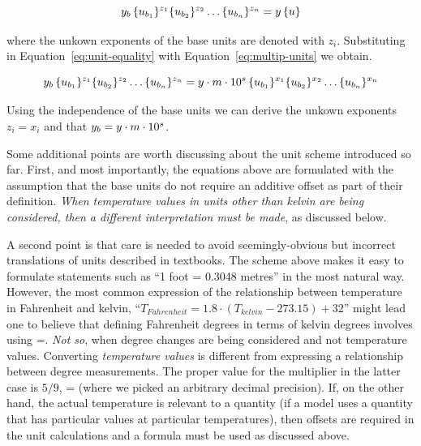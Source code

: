 \begin{linenomath}
\begin{equation}
  y_b \, \{u_{b_1}\}^{z_1} \{u_{b_2}\}^{z_2} \ldots \{u_{b_n}\}^{z_n}
     = y \, \{u\} 
\label{eq:unit-equality}
\end{equation}
\end{linenomath}
where the unkown exponents of the base units are denoted with
$z_i$. Substituting \unew in Equation~\ref{eq:unit-equality} with
Equation~\ref{eq:multip-units} we obtain.
\begin{linenomath}
\begin{equation}
  y_b \, \{u_{b_1}\}^{z_1} \{u_{b_2}\}^{z_2} \ldots \{u_{b_n}\}^{z_n}
    = y \cdot m \cdot 10^s \, \{u_{b_1}\}^{x_1} \{u_{b_2}\}^{x_2} \ldots \{u_{b_n}\}^{x_n}
\label{eq:unit-conversion}
\end{equation}
\end{linenomath}
Using the independence of the base units we can derive the unkown
exponents $z_i = x_i$ and that $y_b = y \cdot m \cdot 10^s$.


\label{sec:unit-simple-approach}
Some additional points are worth discussing about the unit scheme
introduced so far.  First, and most importantly, the equations
above are formulated with the assumption that the base units do
not require an additive offset as part of their definition.
\emph{When temperature values in units other than kelvin are being
  considered, then a different interpretation must be made}, as
discussed below.

A second point is that care is needed to avoid seemingly-obvious
but incorrect translations of units described in textbooks.  The
scheme above makes it easy to formulate statements such as ``1
foot = 0.3048 metres'' in the most natural way.  However, the most
common expression of the relationship between temperature in
Fahrenheit and kelvin, ``$T_{Fahrenheit} = 1.8 \cdot (T_{kelvin} -
273.15) + 32$'' might lead one to believe that defining Fahrenheit
degrees in terms of kelvin degrees involves using
=.  \emph{Not so}, when degree changes
are being considered and not temperature values.  Converting
\emph{temperature values} is different from expressing a
relationship between degree measurements.  The proper value for
the multiplier in the latter case is $5/9$, \ie
{}= (where we picked an arbitrary
decimal precision).  If, on the other hand, the actual temperature
is relevant to a quantity (\eg if a model uses a quantity that has
particular values at particular temperatures), then offsets are
required in the unit calculations and a formula must be used as
discussed above.

